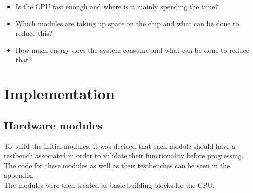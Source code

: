 \documentclass[12pt,a4paper]{article}
\begin{document}
	\begin{itemize}
		\item Is the CPU fast enough and where is it mainly spending the time?
		\item Which modules are taking up space on the chip and what can be done to reduce this?
		\item How much energy does the system consume and what can be done to reduce that?
	\end{itemize}
	
\section{Implementation}
\subsection{Hardware modules}
	To build the initial modules, it was decided that each module should have a testbench associated in order to validate their functionality before progressing. The code for these modules as well as their testbenches can be seen in the appendix.\\
	The modules were then treated as basic building blocks for the CPU.\\
	
\end{document}
